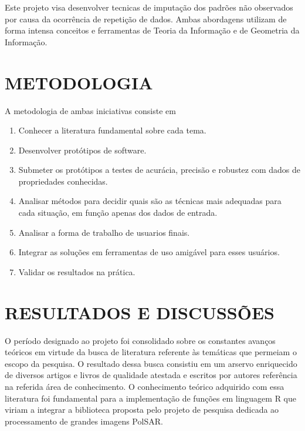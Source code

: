 \documentclass[12pt,letterpaper]{article}
\begin{document}
Este projeto visa desenvolver tecnicas de imputação dos padrões não observados por causa da ocorrência de repetição de dados. Ambas abordagens utilizam de forma intensa conceitos e ferramentas de Teoria da Informação e de Geometria da Informação.

  
\newpage
\section*{\centering \textbf{METODOLOGIA}} %
A metodologia de ambas iniciativas consiste em
\begin{enumerate}
\item Conhecer a literatura fundamental sobre cada tema.
\item Desenvolver protótipos de software.
\item Submeter os protótipos a testes de acurácia, precisão e robustez com dados de propriedades conhecidas.
\item Analisar métodos para decidir quais são as técnicas mais adequadas para cada situação, em função apenas dos dados de entrada.
\item Analisar a forma de trabalho de usuarios finais.
\item Integrar as soluções em ferramentas de uso amigável para esses usuários.
\item Validar os resultados na prática.
\end{enumerate}

  
\newpage
\section*{\centering \textbf{RESULTADOS E DISCUSSÕES}} %
O período designado ao projeto foi consolidado sobre os constantes avanços teóricos em virtude da busca de literatura referente às temáticas que permeiam o escopo da pesquisa. O resultado dessa busca consistiu em um arservo enriquecido de diversos artigos e livros de qualidade atestada e escritos por autores referência na referida área de conhecimento. O conhecimento teórico adquirido com essa literatura foi fundamental para a implementação de funções em linguagem R que viriam a integrar a biblioteca proposta pelo projeto de pesquisa dedicada ao processamento de grandes imagens PolSAR.
\end{document}
